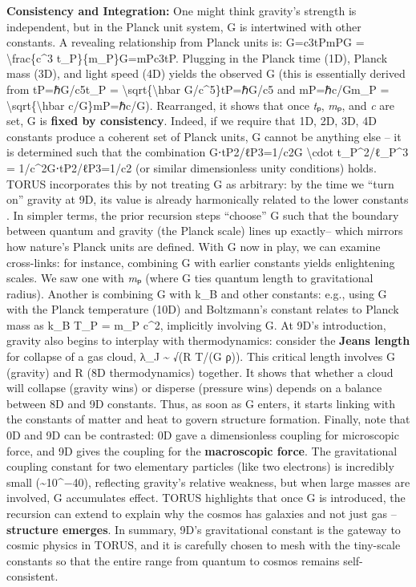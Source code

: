 \documentclass[]{article}
\begin{document}
\textbf{Consistency and Integration:} One might think gravity's strength
is independent, but in the Planck unit system, G is intertwined with
other constants. A revealing relationship from Planck units is:
G=c3tPmPG = \textbackslash{}frac\{c\^{}3 t\_P\}\{m\_P\}G=mP​c3tP​​​.
Plugging in the Planck time (1D), Planck mass (3D), and light speed (4D)
yields the observed G (this is essentially derived from tP=ℏG/c5t\_P =
\textbackslash{}sqrt\{\textbackslash{}hbar G/c\^{}5\}tP​=ℏG/c5​ and
mP=ℏc/Gm\_P = \textbackslash{}sqrt\{\textbackslash{}hbar
c/G\}mP​=ℏc/G​). Rearranged, it shows that once \emph{t}ₚ, \emph{m}ₚ,
and \emph{c} are set, G is \textbf{fixed by consistency}​. Indeed, if we
require that 1D, 2D, 3D, 4D constants produce a coherent set of Planck
units, G cannot be anything else -- it is determined such that the
combination G⋅tP2/ℓP3=1/c2G \textbackslash{}cdot t\_P\^{}2/ℓ\_P\^{}3 =
1/c\^{}2G⋅tP2​/ℓP3​=1/c2 (or similar dimensionless unity conditions)
holds​. TORUS incorporates this by not treating G as arbitrary: by the
time we ``turn on'' gravity at 9D, its value is already harmonically
related to the lower constants​. In simpler terms, the prior recursion
steps ``choose'' G such that the boundary between quantum and gravity
(the Planck scale) lines up exactly​-- which mirrors how nature's Planck
units are defined. With G now in play, we can examine cross-links: for
instance, combining G with earlier constants yields enlightening scales.
We saw one with \emph{m}ₚ (where G ties quantum length to gravitational
radius). Another is combining G with k\_B and other constants: e.g.,
using G with the Planck temperature (10D) and Boltzmann's constant
relates to Planck mass as k\_B T\_P = m\_P c\^{}2, implicitly involving
G​. At 9D's introduction, gravity also begins to interplay with
thermodynamics: consider the \textbf{Jeans length} for collapse of a gas
cloud, λ\_J \textasciitilde{} √(R T/(G ρ)). This critical length
involves G (gravity) and R (8D thermodynamics) together​. It shows that
whether a cloud will collapse (gravity wins) or disperse (pressure wins)
depends on a balance between 8D and 9D constants. Thus, as soon as G
enters, it starts linking with the constants of matter and heat to
govern structure formation. Finally, note that 0D and 9D can be
contrasted: 0D gave a dimensionless coupling for microscopic force, and
9D gives the coupling for the \textbf{macroscopic force}. The
gravitational coupling constant for two elementary particles (like two
electrons) is incredibly small (\textasciitilde{}10\^{}−40), reflecting
gravity's relative weakness, but when large masses are involved, G
accumulates effect. TORUS highlights that once G is introduced, the
recursion can extend to explain why the cosmos has galaxies and not just
gas -- \textbf{structure emerges}. In summary, 9D's gravitational
constant is the gateway to cosmic physics in TORUS, and it is carefully
chosen to mesh with the tiny-scale constants so that the entire range
from quantum to cosmos remains self-consistent.
\end{document}
